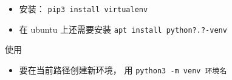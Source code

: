 
\begin{issues}
\issueDraft
\end{issues}

\begin{itemize}
\item 安装： \verb|pip3 install virtualenv|
\item 在 ubuntu 上还需要安装 \verb|apt install python?.?-venv|
\end{itemize}


使用
\begin{itemize}
\item 要在当前路径创建新环境， 用 \verb|python3 -m venv 环境名|
\end{itemize}
